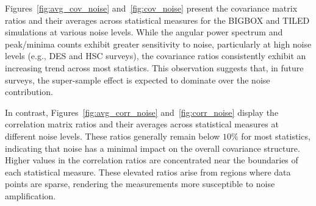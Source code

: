 Figures~\ref{fig:avg_cov_noise} and~\ref{fig:cov_noise} present the covariance matrix ratios and their averages across statistical measures for the BIGBOX and TILED simulations at various noise levels. While the angular power spectrum and peak/minima counts exhibit greater sensitivity to noise, particularly at high noise levels (e.g., DES and HSC surveys), the covariance ratios consistently exhibit an increasing trend across most statistics. This observation suggests that, in future surveys, the super-sample effect is expected to dominate over the noise contribution.

In contrast, Figures~\ref{fig:avg_corr_noise} and~\ref{fig:corr_noise} display the correlation matrix ratios and their averages across statistical measures at different noise levels. These ratios generally remain below $10\%$ for most statistics, indicating that noise has a minimal impact on the overall covariance structure. Higher values in the correlation ratios are concentrated near the boundaries of each statistical measure. These elevated ratios arise from regions where data points are sparse, rendering the measurements more susceptible to noise amplification.

